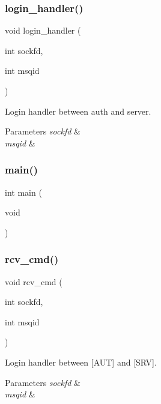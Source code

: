 \subsubsection{login\+\_\+handler()}
{\footnotesize\ttfamily void login\+\_\+handler (\begin{DoxyParamCaption}\item[{int}]{sockfd,  }\item[{int}]{msqid }\end{DoxyParamCaption})}



Login handler between auth and server. 


\begin{DoxyParams}{Parameters}
{\em sockfd} & \\
\hline
{\em msqid} & \\
\hline
\end{DoxyParams}
\mbox{\label{server_8c_ae66f6b31b5ad750f1fe042a706a4e3d4}} 
\subsubsection{main()}
{\footnotesize\ttfamily int main (\begin{DoxyParamCaption}\item[{void}]{ }\end{DoxyParamCaption})}

\mbox{\label{server_8c_abccdfc478d69333f46803552eba43cbb}} 
\subsubsection{rcv\+\_\+cmd()}
{\footnotesize\ttfamily void rcv\+\_\+cmd (\begin{DoxyParamCaption}\item[{int}]{sockfd,  }\item[{int}]{msqid }\end{DoxyParamCaption})}



Login handler between [A\+UT] and [S\+RV]. 


\begin{DoxyParams}{Parameters}
{\em sockfd} & \\
\hline
{\em msqid} & \\
\hline
\end{DoxyParams}
